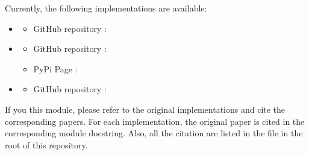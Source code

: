 \documentclass[letterpaper,10pt,english]{sphinxmanual}
\begin{document}
\sphinxAtStartPar
Currently, the following implementations are available:
\begin{itemize}
\item {} \begin{description}
\begin{itemize}
\item {} 
\sphinxAtStartPar
GitHub repository : 

\end{itemize}

\end{description}

\item {} \begin{description}
\begin{itemize}
\item {} 
\sphinxAtStartPar
GitHub repository : 

\item {} 
\sphinxAtStartPar
PyPi Page : 

\end{itemize}

\end{description}

\item {} \begin{description}
\begin{itemize}
\item {} 
\sphinxAtStartPar
GitHub repository : 

\end{itemize}

\end{description}

\end{itemize}

\sphinxAtStartPar
If you this module, please refer to the original implementations and cite the corresponding papers.
For each implementation, the original paper is cited in the corresponding module docstring.
Also, all the citation are listed in the  file in the root of this repository.
\end{document}
